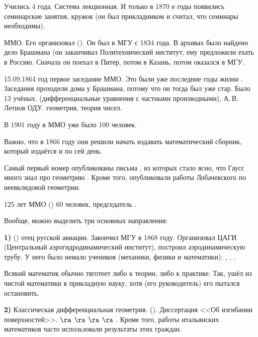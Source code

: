 \documentclass[a4paper,oneside,fleqn,10pt]{article}
\begin{document}
Учились 4 года. Система лекционная. И только в 1870 е годы
появились семинарские занятия, кружок  (он был прикладником
и считал, что семинары необходимы).

ММО. Его организовал  ().
Он был в МГУ с 1834 года.
В архивах было найдено дело Брашмана (он заканчивал Политехнический институт,
ему предложили ехать в Россию. Сначала он поехал в Питер, потом в Казань, потом
оказался в МГУ.

15.09.1864 год первое заседание ММО. Это были уже последние годы жизни .
Заседания проходили дома у Брашмана, потому что он тогда был уже стар.
Было 13 учёных.  (дифференциальные уравнения с частными производными),
А.\,В.\,Летиов ОДУ. 
геометрия,  теория чисел.

В 1901 году в ММО уже было 100 человек.

Важно, что в 1866 году они решили начать
издавать математический сборник, который издаётся и по сей день.

Самый первый номер опубликованы письма  , из которых стало ясно,
что Гаусс много знал про геометрию . Кроме того, опубликовали
работы Лобачевского по неевклидовой геометрии.

125 лет ММО () 60 человек, председатель .

Вообще, можно выделить три основных направления:

\textbf{1)}  () отец русской авиации.
Закончил МГУ в 1868 году. Организовал \hbox{ЦАГИ} (Центральный аэрогидродинамический институт),
построил аэродинамическую трубу.
У него было немало учеников (механики, физики и математики): , , .

Всякий математик обычно тяготеет либо к теории, либо к практике.
Так,  ушёл из чистой математики в прикладную науку, хотя  (его руководитель)
его пытался остановить.

\textbf{2)} Классическая дифференциальная геометрия.  ().
Диссертация <<Об изгибании поверхностей>>.
 $\ra$  $\ra$  $\ra$  $\ra$ .
Кроме того, работы итальянских
математиков часто использовали результаты этих граждан.
\end{document}
